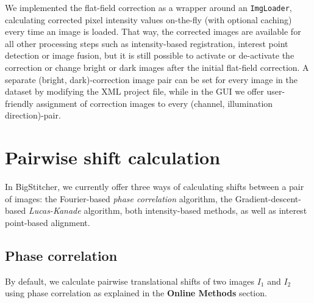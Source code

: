 We implemented the flat-field correction as a wrapper around an \texttt{ImgLoader}, calculating corrected pixel intensity values on-the-fly (with optional caching) every time an image is loaded. That way, the corrected images are available for all other processing steps such as intensity-based registration, interest point detection or image fusion, but it is still possible to activate or de-activate the correction or change bright or dark images after the initial flat-field correction. A separate (bright, dark)-correction image pair can be set for every image in the dataset by modifying the XML project file, while in the GUI we offer user-friendly assignment of correction images to every (channel, illumination direction)-pair.

\section{Pairwise shift calculation}

In BigStitcher, we currently offer three ways of calculating shifts between a pair of images: the Fourier-based \emph{phase correlation} algorithm, the Gradient-descent-based \emph{Lucas-Kanade} algorithm, both intensity-based methods, as well as interest point-based alignment.

\subsection*{Phase correlation}

By default, we calculate pairwise translational shifts of two images $I_1$ and $I_2$ using phase correlation \cite{preibisch2009globally, kuglin1975phase} as explained in the \textbf{Online Methods} section.

%

